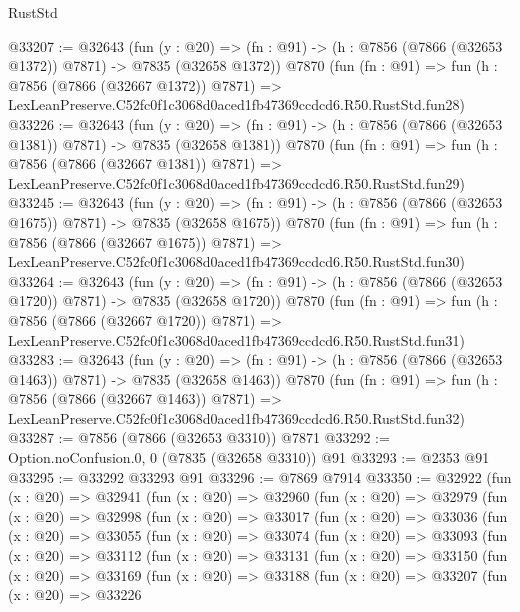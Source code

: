 \begin{lexlean}{RustStd}
\begin{coremodule}
@33207 := @32643
    (fun (y : @20) =>
    (fn : @91) -> (h : @7856 (@7866 (@32653 @1372)) @7871) -> @7835 (@32658 @1372))
    @7870
    (fun (fn : @91) =>
    fun (h : @7856 (@7866 (@32667 @1372)) @7871) =>
    LexLeanPreserve.C52fc0f1c3068d0aced1fb47369ccdcd6.R50.RustStd.fun28)
@33226 := @32643
    (fun (y : @20) =>
    (fn : @91) -> (h : @7856 (@7866 (@32653 @1381)) @7871) -> @7835 (@32658 @1381))
    @7870
    (fun (fn : @91) =>
    fun (h : @7856 (@7866 (@32667 @1381)) @7871) =>
    LexLeanPreserve.C52fc0f1c3068d0aced1fb47369ccdcd6.R50.RustStd.fun29)
@33245 := @32643
    (fun (y : @20) =>
    (fn : @91) -> (h : @7856 (@7866 (@32653 @1675)) @7871) -> @7835 (@32658 @1675))
    @7870
    (fun (fn : @91) =>
    fun (h : @7856 (@7866 (@32667 @1675)) @7871) =>
    LexLeanPreserve.C52fc0f1c3068d0aced1fb47369ccdcd6.R50.RustStd.fun30)
@33264 := @32643
    (fun (y : @20) =>
    (fn : @91) -> (h : @7856 (@7866 (@32653 @1720)) @7871) -> @7835 (@32658 @1720))
    @7870
    (fun (fn : @91) =>
    fun (h : @7856 (@7866 (@32667 @1720)) @7871) =>
    LexLeanPreserve.C52fc0f1c3068d0aced1fb47369ccdcd6.R50.RustStd.fun31)
@33283 := @32643
    (fun (y : @20) =>
    (fn : @91) -> (h : @7856 (@7866 (@32653 @1463)) @7871) -> @7835 (@32658 @1463))
    @7870
    (fun (fn : @91) =>
    fun (h : @7856 (@7866 (@32667 @1463)) @7871) =>
    LexLeanPreserve.C52fc0f1c3068d0aced1fb47369ccdcd6.R50.RustStd.fun32)
@33287 := @7856 (@7866 (@32653 @3310)) @7871
@33292 := Option.noConfusion.{0, 0} (@7835 (@32658 @3310)) @91
@33293 := @2353 @91
@33295 := @33292 @33293 @91
@33296 := @7869 @7914
@33350 := @32922
    (fun (x : @20) =>
    @32941
      (fun (x : @20) =>
      @32960
        (fun (x : @20) =>
        @32979
          (fun (x : @20) =>
          @32998
            (fun (x : @20) =>
            @33017
              (fun (x : @20) =>
              @33036
                (fun (x : @20) =>
                @33055
                  (fun (x : @20) =>
                  @33074
                    (fun (x : @20) =>
                    @33093
                      (fun (x : @20) =>
                      @33112
                        (fun (x : @20) =>
                        @33131
                          (fun (x : @20) =>
                          @33150
                            (fun (x : @20) =>
                            @33169
                              (fun (x : @20) =>
                              @33188
                                (fun (x : @20) =>
                                @33207
                                  (fun (x : @20) =>
                                  @33226

\end{coremodule}
\end{lexlean}
